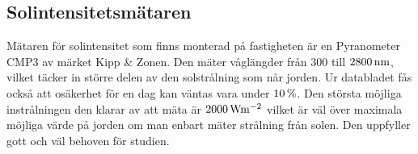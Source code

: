 \subsection{Solintensitetsmätaren}\label{subsec:sunmeter}
Mätaren för solintensitet som finns monterad på fastigheten är en Pyranometer CMP3 av märket Kipp \& Zonen. Den mäter våglängder från $300$ till $\unit[2800]{nm}$, vilket täcker in större delen av den solstrålning som når jorden. Ur databladet fås också att osäkerhet för en dag kan väntas vara under $\unit[10]{\%}$. Den största möjliga instrålningen den klarar av att mäta är $\unit[2000]{W m^{-2}}$ vilket är väl över maximala möjliga värde på jorden om man enbart mäter strålning från solen\cite{physicshandbook}. Den uppfyller gott och väl behoven för studien.\cite{datasheet_sun}



